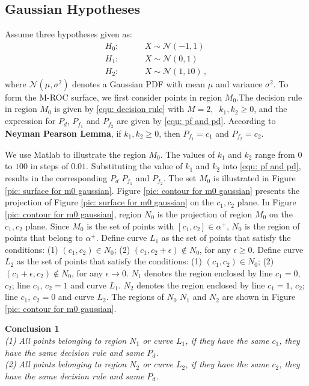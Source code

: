 \documentclass[12pt,journal,a4paper,twoside,onecolumn]{IEEEtran}
\begin{document}
\begin{spacing}{2.5}
\subsection{Gaussian Hypotheses}
Assume three hypotheses given as:
\begin{equation}
\label{equ: Gaussian Hypothesis}
\begin{split}
	H_0:\;\;\;\;\;\;\;\;&X \sim \mathcal{N}(-1,1)\\
    H_1:\;\;\;\;\;\;\;\;&X \sim \mathcal{N}(0,1)\\
    H_2:\;\;\;\;\;\;\;\;&X \sim \mathcal{N}(1,10)\,,
\end{split}
\end{equation}
where $\mathcal{N}(\mu,\sigma^2)$ denotes a Gaussian PDF with mean $\mu$ and variance $\sigma^2$.
To form the M-ROC surface, we first consider points in region $M_0$.The decision rule in region $M_0$ is given by \eqref{equ: decision rule}
with $M=2,\;\;k_1, k_2 \geq 0$, and the expression for $P_d$, $P_{f_1}$ and $P_{f_2}$ are given by \eqref{equ: pf and pd}. According to \textbf{Neyman Pearson Lemma}, if $k_1, k_2 \geq 0$, then $P_{f_1} = c_1$ and $P_{f_2} = c_2$.

We use Matlab to illustrate the region $M_0$. The values of $k_1$ and $k_2$ range from $0$ to $100$ in steps of $0.01$. Substituting the value of $k_1$ and $k_2$ into \eqref{equ: pf and pd}, results in the corresponding $P_d$ $P_{f_1}$ and $P_{f_2}$.  The set $M_0$ is illustrated in Figure \ref{pic: surface for m0 gaussian}. Figure \ref{pic: contour for m0 gaussian} presents the projection of Figure \ref{pic: surface for m0 gaussian} on the $c_1, c_2$ plane.
In Figure \ref{pic: contour for m0 gaussian}, region $N_0$ is the projection of region $M_0$ on the $c_1, c_2$ plane. Since $M_0$ is the set of points with $[c_1, c_2] \in \alpha^+$, $N_0$ is the region of points that belong to $\alpha^+$.
Define curve $L_1$ as the set of points that satisfy the conditions: (1) $(c_1, c_2) \in N_0$; (2) $(c_1, c_2+\epsilon) \notin N_0$, for any $\epsilon \geq 0$. Define curve $L_2$ as the set of points that satisfy the conditions: (1) $(c_1, c_2) \in N_0$; (2) $(c_1 + \epsilon, c_2) \notin N_0$, for any $\epsilon \rightarrow 0$.
$N_1$ denotes the region enclosed by line $c_1 = 0$, $c_2$; line $c_1$, $c_2 = 1$ and curve $L_1$.
$N_2$ denotes the region enclosed by line $c_1 = 1$, $c_2$; line $c_1$, $c_2 = 0$ and curve $L_2$.
The regions of $N_0$ $N_1$ and $N_2$ are shown in Figure \ref{pic: contour for m0 gaussian}.

\textbf{Conclusion 1}
\textit{\\(1) All points belonging to region $N_1$ or curve $L_1$, if they have the same $c_1$, they have the same decision rule and same $P_d$.
\\(2) All points belonging to region $N_2$ or curve $L_2$, if they have the same $c_2$, they have the same decision rule and same $P_d$.
}


\end{spacing}
\end{document}

